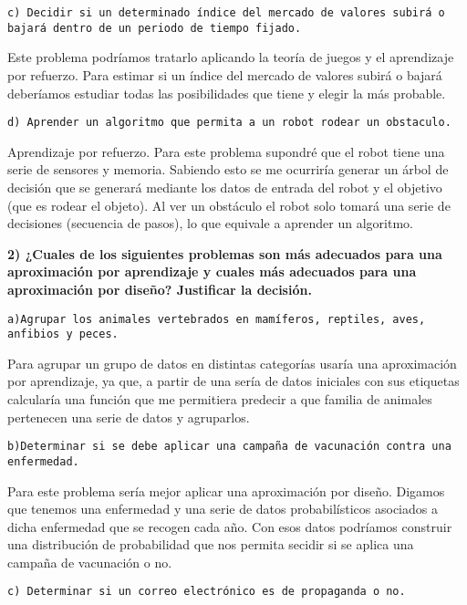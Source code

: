 \documentclass[]{article}
\begin{document}
\begin{verbatim}
c) Decidir si un determinado índice del mercado de valores subirá o bajará dentro de un periodo de tiempo fijado.
\end{verbatim}

Este problema podríamos tratarlo aplicando la teoría de juegos y el
aprendizaje por refuerzo. Para estimar si un índice del mercado de
valores subirá o bajará deberíamos estudiar todas las posibilidades que
tiene y elegir la más probable.

\begin{verbatim}
d) Aprender un algoritmo que permita a un robot rodear un obstaculo.
\end{verbatim}

Aprendizaje por refuerzo. Para este problema supondré que el robot tiene
una serie de sensores y memoria. Sabiendo esto se me ocurriría generar
un árbol de decisión que se generará mediante los datos de entrada del
robot y el objetivo (que es rodear el objeto). Al ver un obstáculo el
robot solo tomará una serie de decisiones (secuencia de pasos), lo que
equivale a aprender un algoritmo.

\textbf{2) ¿Cuales de los siguientes problemas son más adecuados para
una aproximación por aprendizaje y cuales más adecuados para una
aproximación por diseño? Justificar la decisión.}

\begin{verbatim}
a)Agrupar los animales vertebrados en mamíferos, reptiles, aves, anfibios y peces.
\end{verbatim}

Para agrupar un grupo de datos en distintas categorías usaría una
aproximación por aprendizaje, ya que, a partir de una sería de datos
iniciales con sus etiquetas calcularía una función que me permitiera
predecir a que familia de animales pertenecen una serie de datos y
agruparlos.

\begin{verbatim}
b)Determinar si se debe aplicar una campaña de vacunación contra una enfermedad.
\end{verbatim}

Para este problema sería mejor aplicar una aproximación por diseño.
Digamos que tenemos una enfermedad y una serie de datos probabilísticos
asociados a dicha enfermedad que se recogen cada año. Con esos datos
podríamos construir una distribución de probabilidad que nos permita
secidir si se aplica una campaña de vacunación o no.

\begin{verbatim}
c) Determinar si un correo electrónico es de propaganda o no.
\end{verbatim}
\end{document}
